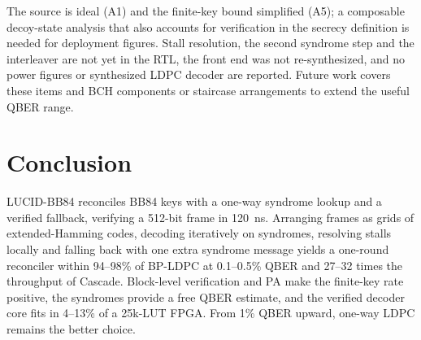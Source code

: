 \documentclass[conference]{IEEEtran}
\begin{document}
The source is ideal (A1) and the finite-key bound simplified (A5); a composable decoy-state analysis that also accounts for verification in the secrecy definition is needed for deployment figures. Stall resolution, the second syndrome step and the interleaver are not yet in the RTL, the front end was not re-synthesized, and no power figures or synthesized LDPC decoder are reported. Future work covers these items and BCH components or staircase arrangements to extend the useful QBER range.

\section{Conclusion}\label{sec:conclusion}
LUCID-BB84 reconciles BB84 keys with a one-way syndrome lookup and a verified fallback, verifying a 512-bit frame in 120~ns. Arranging frames as grids of extended-Hamming codes, decoding iteratively on syndromes, resolving stalls locally and falling back with one extra syndrome message yields a one-round reconciler within 94--98\% of BP-LDPC at 0.1--0.5\% QBER and 27--32 times the throughput of Cascade. Block-level verification and PA make the finite-key rate positive, the syndromes provide a free QBER estimate, and the verified decoder core fits in 4--13\% of a 25k-LUT FPGA. From 1\% QBER upward, one-way LDPC remains the better choice.
\end{document}
